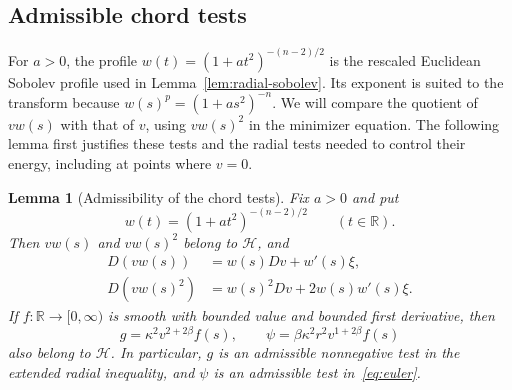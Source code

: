 \documentclass[11pt]{article}
\numberwithin{equation}{section}
\newtheorem{lemma}[theorem]{Lemma}
\theoremstyle{definition}
\theoremstyle{remark}
\begin{document}
\subsection{Admissible chord tests}

For $a>0$, the profile $w(t)=(1+at^2)^{-(n-2)/2}$ is the rescaled
Euclidean Sobolev profile used in Lemma~\ref{lem:radial-sobolev}.
Its exponent is suited to the transform because
$w(s)^p=(1+as^2)^{-n}$. We will compare the quotient of $vw(s)$
with that of $v$, using $vw(s)^2$ in the minimizer equation.
The following lemma first justifies these tests and the radial tests
needed to control their energy, including at points where $v=0$.

\begin{lemma}[Admissibility of the chord tests]\label{lem:chord-tests}
Fix $a>0$ and put
\[
 w(t)=(1+at^2)^{-(n-2)/2}\qquad(t\in\mathbb R).
\]
Then $vw(s)$ and $vw(s)^2$ belong to $\mathcal H$, and
\begin{equation}\label{chord:product-rules}
 \begin{split}
 D(vw(s))&=w(s)Dv+w'(s)\xi,\\
 D(vw(s)^2)&=w(s)^2Dv+2w(s)w'(s)\xi.
 \end{split}
\end{equation}
If $f:\mathbb R\to[0,\infty)$ is smooth with bounded value and bounded
first derivative, then
\begin{equation}\label{chord:radial-tests}
 g=\kappa^2v^{2+2\beta}f(s),\qquad
 \psi=\beta\kappa^2r^2v^{1+2\beta}f(s)
\end{equation}
also belong to $\mathcal H$. In particular, $g$ is an admissible
nonnegative test in the extended radial inequality, and $\psi$
is an admissible test in~\eqref{eq:euler}.
\end{lemma}
\end{document}

